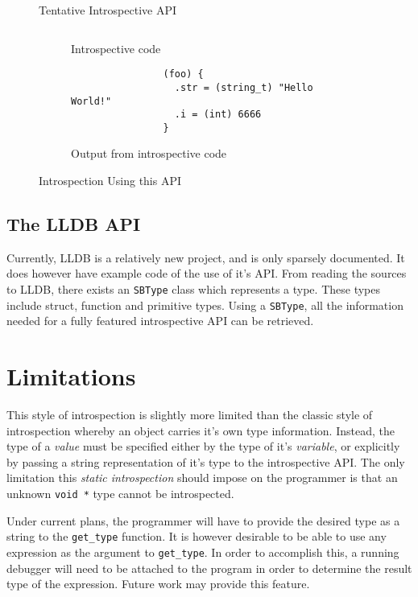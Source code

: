 \documentclass[draft]{article}
\begin{document}
\begin{figure}
	{
		\footnotesize
		\inputminted[tabsize=2]{c}{introspection.h}
	}
	\caption{Tentative Introspective API}
	\label{fig:introspective_api}
\end{figure}

\begin{figure}
	\begin{subfigure}{\linewidth}
		{
			\footnotesize
			\inputminted[tabsize=2]{c}{struct_introspect.c}
		}
		\caption{Introspective code}
		\label{fig:struct_introspect:code}
	\end{subfigure}
	\begin{subfigure}{\linewidth}
		{
			\footnotesize
			\begin{verbatim}
				(foo) {
				  .str = (string_t) "Hello World!"
				  .i = (int) 6666
				}
			\end{verbatim}
		}
		\caption{Output from introspective code}
		\label{fig:struct_introspect:output}
	\end{subfigure}
	\caption{Introspection Using this API}
	\label{fig:struct_introspect}
\end{figure}

\subsection{The LLDB API}
Currently, LLDB is a relatively new project, and is only sparsely documented. It
does however have example code of the use of it's API. From reading the sources
to LLDB, there exists an \texttt{SBType} class which represents a type. These
types include struct, function and primitive types. Using a \texttt{SBType}, all
the information needed for a fully featured introspective API can be retrieved.

\section{Limitations}
This style of introspection is slightly more limited than the classic style of
introspection whereby an object carries it's own type information. Instead, the
type of a \emph{value} must be specified either by the type of it's
\emph{variable}, or explicitly by passing a string representation of it's type
to the introspective API. The only limitation this \emph{static introspection}
should impose on the programmer is that an unknown \lstinline|void *| type
cannot be introspected.

Under current plans, the programmer will have to provide the desired type as a
string to the \texttt{get\_type} function. It is however desirable to be able to
use any expression as the argument to \texttt{get\_type}. In order to accomplish
this, a running debugger will need to be attached to the program in
order to determine the result type of the expression. Future work may provide
this feature.
\end{document}
